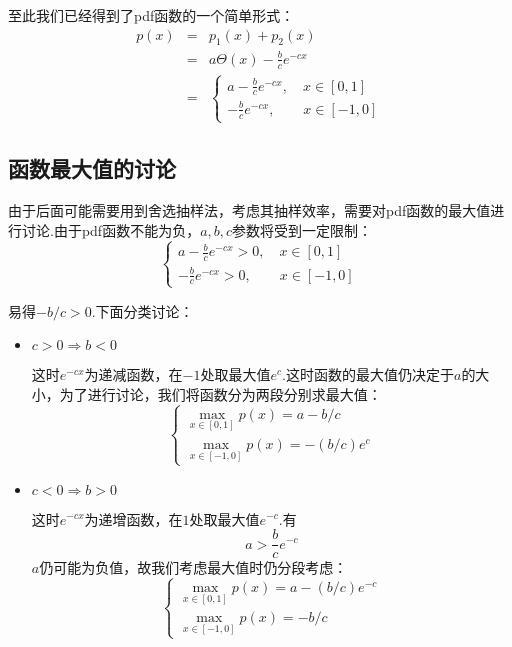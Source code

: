 \documentclass[12pt,a4paper,utf8]{ctexart}
\begin{document}
至此我们已经得到了pdf函数的一个简单形式：
\begin{eqnarray}
    p(x) &=& p_1(x) + p_2(x) \nonumber \\
         &=& a \Theta (x) - \frac{b}{c} e^{-cx} \nonumber \\
         &=& 
         \begin{cases}
             a - \frac{b}{c} e^{-cx},\quad x \in [0,1] \\
             - \frac{b}{c} e^{-cx},\qquad x \in [-1,0]
         \end{cases}
\end{eqnarray}

\subsection{函数最大值的讨论}

由于后面可能需要用到舍选抽样法，考虑其抽样效率，需要对pdf函数的最大值进行讨论.由于pdf函数不能为负，$a,b,c$参数将受到一定限制：
\begin{equation}
    \begin{cases}
        a - \frac{b}{c}e^{-cx} > 0,\quad x \in [0,1] \\
        - \frac{b}{c} e^{-cx} > 0,\qquad x \in [-1,0]
    \end{cases}
\end{equation}

易得$-b/c > 0$.下面分类讨论：
\begin{itemize}
    \item $c > 0 \Rightarrow b < 0$

        这时$e^{-cx}$为递减函数，在$-1$处取最大值$e^{c}$.这时函数的最大值仍决定于$a$的大小，为了进行讨论，我们将函数分为两段分别求最大值：
        \begin{equation}
            \begin{cases}
                \max_{x \in [0,1]}p(x) = a - b/c \\
                \max_{x \in [-1,0]}p(x) = - (b/c)e^{c}
            \end{cases}
        \end{equation}
    \item $c < 0 \Rightarrow b > 0$

        这时$e^{-cx}$为递增函数，在$1$处取最大值$e^{-c}$.有
        \begin{equation}
            a > \frac{b}{c}e^{-c} 
        \end{equation}
        $a$仍可能为负值，故我们考虑最大值时仍分段考虑：
        \begin{equation}
            \begin{cases}
                \max _{x \in [0,1]}p(x) = a - (b/c)e^{-c} \\
                \max _{x \in [-1,0]}p(x) = -b/c
            \end{cases}
        \end{equation}
\end{itemize}
\end{document}

